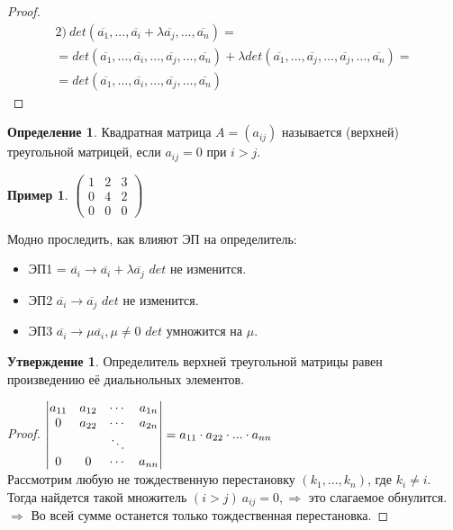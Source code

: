 \documentclass[a4paper, 12pt]{article}
\newcommand\tab[1][.5cm]{\hspace*{#1}}
\theoremstyle{definition}
\newtheorem*{definition}{Определение}
\newtheorem*{subtheorem}{Утверждение}
\newtheorem*{example1}{Пример}
\begin{document}
  \begin{proof} \tab
    \begin{multline*}
      2) \ det(\overline{a_1},...,\overline{a_i}+\lambda \overline{a_j},...,\overline{a_n}) = \\ = det(\overline{a_1},...,\overline{a_i},...,\overline{a_j},...,\overline{a_n}) + \lambda det(\overline{a_1},...,\overline{a_j},...,\overline{a_j},...,\overline{a_n}) = \\ = det(\overline{a_1},...,\overline{a_i},...,\overline{a_j},...,\overline{a_n})
    \end{multline*}
  \end{proof} 
  \begin{definition}
    Квадратная матрица $A = (a_{ij})$ называется (верхней) треугольной матрицей, если $a_{ij} = 0$ при $i>j$. 
    \begin{example1}
      $\begin{pmatrix}
        1 & 2 & 3 \\ 0 & 4 & 2 \\ 0 & 0& 0
      \end{pmatrix}$
    \end{example1}  
  \end{definition} 
  Модно проследить, как влияют ЭП на определитель:
  \begin{itemize}
    \item ЭП1 = $\overline{a_i} \to \overline{a_i} + \lambda \overline{a_j}$ \tab[0.3cm] $det$ не изменится. 
    \item ЭП2 $\overline{a_i} \to \overline{a_j}$ \tab[2.15cm] $det$ не изменится. 
    \item ЭП3 $\overline{a_i} \to \mu \overline{a_i}, \mu \not = 0$ \tab[0.45cm] $det$ умножится на $\mu$. 
  \end{itemize}
  \begin{subtheorem}
    Определитель верхней треугольной матрицы равен произведению её диальнольных элементов.
  \end{subtheorem} 
  \begin{proof}
    $\begin{vmatrix}
      a_{11} & a_{12} & \cdots & a_{1n} \\
      0 & a_{22} & \cdots & a_{2n} \\
      \null & \null & \ddots & \null \\
      0 & 0 & \cdots & a_{nn} 
    \end{vmatrix} = a_{11}\cdot a_{22}\cdot...\cdot a_{nn}$ \\
    Рассмотрим любую не тождественную перестановку $(k_1,...,k_n)$, где $k_i \not = i$. Тогда найдется такой множитель $(i>j) \ a_{ij} = 0,  \Longrightarrow $ это слагаемое обнулится. $\Longrightarrow $ Во всей сумме останется только тождественная перестановка. 
    
  \end{proof} 
   
\end{document}
